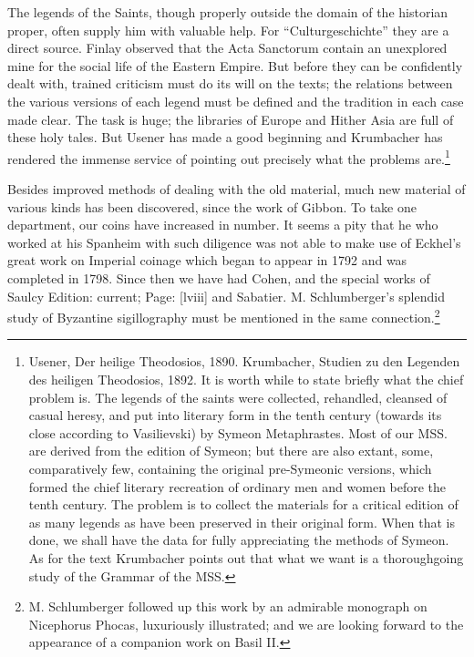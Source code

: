 The legends of the Saints, though properly outside the domain of the historian proper, often supply him with valuable help. For \texthebrew{“}Culturgeschichte\texthebrew{}” they are a direct source. Finlay observed that the Acta Sanctorum contain an unexplored mine for the social life of the Eastern Empire. But before they can be confidently dealt with, trained criticism must do its will on the texts; the relations between the various versions of each legend must be defined and the tradition in each case made clear. The task is huge; the libraries of Europe and Hither Asia are full of these holy tales. But Usener has made a good beginning and Krumbacher has rendered the immense service of pointing out precisely what the problems are.\footnote{Usener, Der heilige Theodosios, 1890. Krumbacher, Studien zu den Legenden des heiligen Theodosios, 1892. It is worth while to state briefly what the chief problem is. The legends of the saints were collected, rehandled, cleansed of casual heresy, and put into literary form in the tenth century (towards its close according to Vasilievski) by Symeon Metaphrastes. Most of our MSS. are derived from the edition of Symeon; but there are also extant, some, comparatively few, containing the original pre-Symeonic versions, which formed the chief literary recreation of ordinary men and women before the tenth century. The problem is to collect the materials for a critical edition of as many legends as have been preserved in their original form. When that is done, we shall have the data for fully appreciating the methods of Symeon. As for the text Krumbacher points out that what we want is a thoroughgoing study of the Grammar of the MSS.}

Besides improved methods of dealing with the old material, much new material of various kinds has been discovered, since the work of Gibbon. To take one department, our coins have increased in number. It seems a pity that he who worked at his Spanheim with such diligence was not able to make use of Eckhel\texthebrew{}’s great work on Imperial coinage which began to appear in 1792 and was completed in 1798. Since then we have had Cohen, and the special works of Saulcy Edition: current; Page: [lviii] and Sabatier. M. Schlumberger\texthebrew{}’s splendid study of Byzantine sigillography must be mentioned in the same connection.\footnote{M. Schlumberger followed up this work by an admirable monograph on Nicephorus Phocas, luxuriously illustrated; and we are looking forward to the appearance of a companion work on Basil II.}

